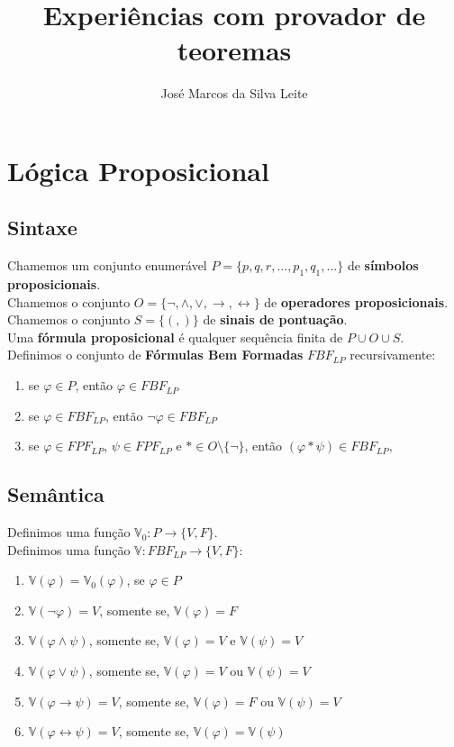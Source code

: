 \documentclass[a4paper,final,12pt]{article}
\title{Experiências com provador de teoremas}
\author{José Marcos da Silva Leite}
\begin{document}
	\maketitle
	
	\section{Lógica Proposicional}
	\subsection{Sintaxe}
	\indent Chamemos um conjunto enumerável $P = \{p, q, r, ..., p_{1}, q_{1}, ...\}$ de \textbf{símbolos proposicionais}. \\
	\indent Chamemos o conjunto $O = \{\lnot, \land, \lor, \to, \leftrightarrow \}$ de \textbf{operadores proposicionais}. \\
	\indent Chamemos o conjunto $S = \{(, )\}$ de \textbf{sinais de pontuação}. \\
	\indent Uma \textbf{fórmula proposicional} é qualquer sequência finita de $P \cup O \cup S$. \\
	\indent Definimos o conjunto de \textbf{Fórmulas Bem Formadas} $FBF_{LP}$ recursivamente:
	\begin{enumerate}
		\item se $\varphi \in P$, então $\varphi \in FBF_{LP}$
		\item se $\varphi \in FBF_{LP}$, então $\lnot\varphi \in FBF_{LP}$
		\item se $\varphi \in FPF_{LP}$, $\psi \in FPF_{LP}$ e $* \in O \setminus \{\lnot\}$, então $(\varphi * \psi) \in FBF_{LP},$
	\end{enumerate}

	\subsection{Semântica}
	Definimos uma função $\mathbb{V}_{0} : P \to \{V, F\}$. \\
	\indent Definimos uma função $\mathbb{V} : FBF_{LP} \to \{V, F\}$:
	\begin{enumerate}
		\item $\mathbb{V}(\varphi) = \mathbb{V}_{0}(\varphi)$, se $\varphi \in P$
		\item $\mathbb{V}(\lnot\varphi) = V$, somente se, $\mathbb{V}(\varphi) = F$
		\item $\mathbb{V}(\varphi \land \psi)$, somente se, $\mathbb{V}(\varphi) = V$ e $\mathbb{V}(\psi) = V$
		\item $\mathbb{V}(\varphi \lor \psi)$, somente se, $\mathbb{V}(\varphi) = V$ ou $\mathbb{V}(\psi) = V$
		\item $\mathbb{V}(\varphi \to \psi) = V$, somente se, $\mathbb{V}(\varphi) = F$ ou $\mathbb{V}(\psi) = V$
		\item $\mathbb{V}(\varphi \leftrightarrow \psi) = V$, somente se, $\mathbb{V}(\varphi) = \mathbb{V}(\psi)$
	\end{enumerate}
	
\end{document}
